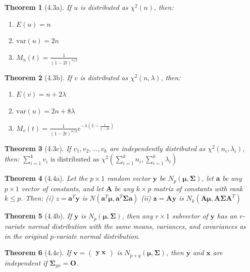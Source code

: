 \documentclass{article}
\newtheorem{theorem}{Theorem}[section]
\begin{document}
\begin{theorem}[4.3a]
If $u$ is distributed as $\chi^2(n)$, then:
\begin{enumerate}
    \item $E(u) = n$
    \item $\text{var}(u) = 2n$
    \item $M_u(t) = \frac{1}{(1-2t)^{n/2}}$
\end{enumerate}
\end{theorem}

\begin{theorem}[4.3b]
If $v$ is distributed as $\chi^2(n,\lambda)$, then:
\begin{enumerate}
    \item $E(v) = n+2\lambda$
    \item $\text{var}(u) = 2n + 8\lambda$
    \item $M_v(t) = \frac{1}{(1-2t)^{n/2}}e^{-\lambda\left(1-\frac{1}{1-2t}\right)}$
\end{enumerate}
\end{theorem}

\begin{theorem}[4.3c]
If $v_1, v_2, ..., v_k$ are independently distributed as $\chi^2(n_i,\lambda_i)$, then:
$\sum_{i=1}^k v_i \text{ is distributed as } \chi^2(\sum_{i=1}^k n_i, \sum_{i=1}^k \lambda_i)$
\end{theorem}

\begin{theorem}[4.4a]
Let the $p \times 1$ random vector $\mathbf{y}$ be $N_p(\boldsymbol{\mu}, \boldsymbol{\Sigma})$, let $\mathbf{a}$ be any $p \times 1$ vector of constants, and let $\mathbf{A}$ be any $k \times p$ matrix of constants with rank $k \leq p$. Then:
(i) $z = \mathbf{a}^T\mathbf{y}$ is $N(\mathbf{a}^T\boldsymbol{\mu}, \mathbf{a}^T\boldsymbol{\Sigma}\mathbf{a})$
(ii) $\mathbf{z} = \mathbf{A}\mathbf{y}$ is $N_k(\mathbf{A}\boldsymbol{\mu}, \mathbf{A}\boldsymbol{\Sigma}\mathbf{A}^T)$
\end{theorem}

\begin{theorem}[4.4b]
If $\mathbf{y}$ is $N_p(\boldsymbol{\mu}, \boldsymbol{\Sigma})$, then any $r \times 1$ subvector of $\mathbf{y}$ has an $r$-variate normal distribution with the same means, variances, and covariances as in the original $p$-variate normal distribution.
\end{theorem}

\begin{theorem}[4.4c]
If $\mathbf{v} = \begin{pmatrix} \mathbf{y} \ \mathbf{x} \end{pmatrix}$ is $N_{p+q}(\boldsymbol{\mu}, \boldsymbol{\Sigma})$, then $\mathbf{y}$ and $\mathbf{x}$ are independent if $\boldsymbol{\Sigma}_{yx} = \mathbf{O}$.
\end{theorem}
\end{document}
